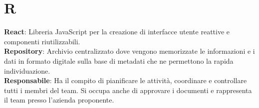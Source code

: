 \section*{R}
\textbf{React}: Libreria JavaScript per la creazione di interfacce utente reattive e componenti riutilizzabili.\\
\textbf{Repository}: Archivio centralizzato dove vengono memorizzate le informazioni e i dati in formato digitale sulla base di metadati che ne permettono la rapida individuazione.\\
\textbf{Responsabile}: Ha il compito di pianificare le attività, coordinare e controllare tutti i membri del team. Si occupa anche di approvare i documenti e rappresenta il team presso l'azienda proponente.\\
